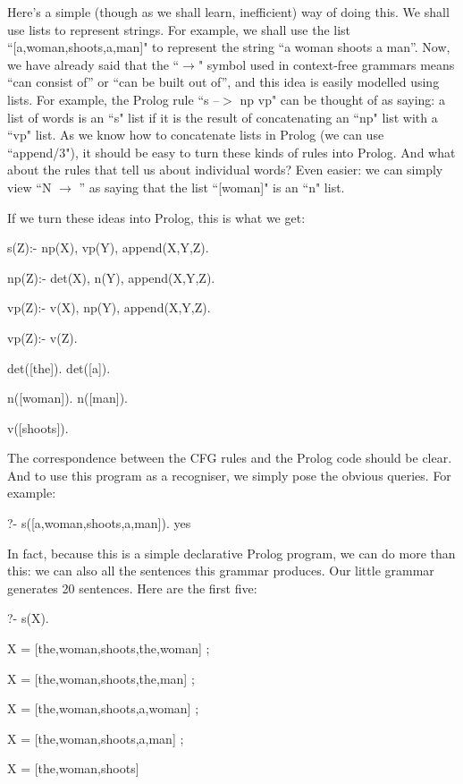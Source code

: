 Here's a simple (though as we shall learn, inefficient) way of doing
this.  We shall use lists to represent strings.  For example, we shall
use the list ``[a,woman,shoots,a,man]" to represent the string
``a woman shoots a man''.  Now, we have already said that the
``$\rightarrow$" symbol used in context-free grammars means ``can consist
of'' or ``{can be built out of}'', and this idea is easily
modelled using lists.  For example, the Prolog rule ``s --$>$ np vp" can be
thought of as saying: a list of words is an ``s" list if it is the
result of concatenating an ``np" list with a ``vp" list.  As we know how
to concatenate lists in Prolog (we can use ``append/3"), it should be
easy to turn these kinds of rules into Prolog.  And what about the
rules that tell us about individual words?  Even easier: we can simply
view ``N $\rightarrow$ '' as saying that the list ``[woman]" is an
``n" list.

If we turn these ideas into Prolog, this is what we get:
\begin{LPNcodedisplay}
s(Z):- np(X), vp(Y), append(X,Y,Z).

np(Z):- det(X), n(Y), append(X,Y,Z).

vp(Z):- v(X), np(Y), append(X,Y,Z).

vp(Z):- v(Z).

det([the]).
det([a]).

n([woman]).
n([man]).

v([shoots]).
\end{LPNcodedisplay}


The correspondence between the CFG rules and the Prolog code should be
clear.  And to use this program as a recogniser, we simply pose the
obvious queries.  For example:
\begin{LPNcodedisplay}
?- s([a,woman,shoots,a,man]).
yes
\end{LPNcodedisplay}

In fact, because this is a simple declarative Prolog program, we can
do more than this: we can also  all the sentences this
grammar produces.  Our little grammar generates 20 sentences.
Here are the first five:
\begin{LPNcodedisplay}
?- s(X).

X = [the,woman,shoots,the,woman] ;

X = [the,woman,shoots,the,man] ;

X = [the,woman,shoots,a,woman] ;

X = [the,woman,shoots,a,man] ;

X = [the,woman,shoots]
\end{LPNcodedisplay}

